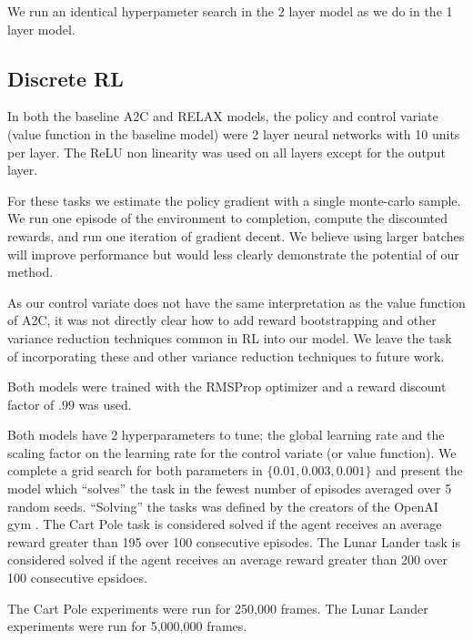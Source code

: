 \documentclass{article}
\begin{document}
We run an identical hyperpameter search in the 2 layer model as we do in the 1 layer model. 


\subsection{Discrete RL}
In both the baseline A2C and RELAX models, the policy and control variate (value function in the baseline model) were 2 layer neural networks with 10 units per layer. The ReLU non linearity was used on all layers except for the output layer.

For these tasks we estimate the policy gradient with a single monte-carlo sample. We run one episode of the environment to completion, compute the discounted rewards, and run one iteration of gradient decent. We believe using larger batches will improve performance but would less clearly demonstrate the potential of our method. 

As our control variate does not have the same interpretation as the value function of A2C, it was not directly clear how to add reward bootstrapping and other variance reduction techniques common in RL into our model. We leave the task of incorporating these and other variance reduction techniques to future work.  

Both models were trained with the RMSProp \cite{Tieleman2012} optimizer and a reward discount factor of $.99$ was used.

Both models have 2 hyperparameters to tune; the global learning rate and the scaling factor on the learning rate for the control variate (or value function). We complete a grid search for both parameters in $\{0.01, 0.003, 0.001\}$ and present the model which ``solves'' the task in the fewest number of episodes averaged over 5 random seeds. ``Solving'' the tasks was defined by the creators of the OpenAI gym \cite{1606.01540}. The Cart Pole task is considered solved if the agent receives an average reward greater than 195 over 100 consecutive episodes. The Lunar Lander task is considered solved if the agent receives an average reward greater than 200 over 100 consecutive epsidoes. 

The Cart Pole experiments were run for 250,000 frames. The Lunar Lander experiments were run for 5,000,000 frames. 
\end{document}
